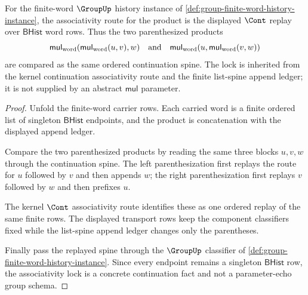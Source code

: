 \begin{theorem}
\label{thm:group-finite-word-cont-associativity-lock}
For the finite-word $\GroupUp$ history instance of
\autoref{def:group-finite-word-history-instance}, the associativity route for
the product is the displayed $\Cont$ replay over $\mathsf{BHist}$ word rows.
Thus the two parenthesized products
$$
\mathsf{mul}_{\mathrm{word}}(\mathsf{mul}_{\mathrm{word}}(u,v),w)
\quad\hbox{and}\quad
\mathsf{mul}_{\mathrm{word}}(u,\mathsf{mul}_{\mathrm{word}}(v,w))
$$
are compared as the same ordered continuation spine. The lock is inherited
from the kernel continuation associativity route and the finite list-spine
append ledger; it is not supplied by an abstract $\mathsf{mul}$ parameter.
\end{theorem}
\begin{proof}
Unfold the finite-word carrier rows. Each carried word is a finite ordered list
of singleton $\mathsf{BHist}$ endpoints, and the product is concatenation with
the displayed append ledger.

Compare the two parenthesized products by reading the same three blocks
$u,v,w$ through the continuation spine. The left parenthesization first replays
the route for $u$ followed by $v$ and then appends $w$; the right
parenthesization first replays $v$ followed by $w$ and then prefixes $u$.

The kernel $\Cont$ associativity route identifies these as one ordered replay
of the same finite rows. The displayed transport rows keep the component
classifiers fixed while the list-spine append ledger changes only the
parentheses.

Finally pass the replayed spine through the $\GroupUp$ classifier of
\autoref{def:group-finite-word-history-instance}. Since every endpoint remains
a singleton $\mathsf{BHist}$ row, the associativity lock is a concrete
continuation fact and not a parameter-echo group schema.
\end{proof}


